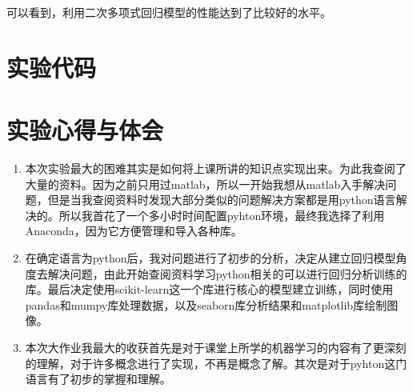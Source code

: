 \documentclass{source/Experiment}
\begin{document}
            可以看到，利用二次多项式回归模型的性能达到了比较好的水平。
    \section{实验代码}
        
    \section{实验心得与体会}
        \begin{enumerate}
            \item 本次实验最大的困难其实是如何将上课所讲的知识点实现出来。为此我查阅了大量的资料。因为之前只用过matlab，所以一开始我想从matlab入手解决问题，但是当我查阅资料时发现大部分类似的问题解决方案都是用python语言解决的。所以我首花了一个多小时时间配置pyhton环境，最终我选择了利用Anaconda，因为它方便管理和导入各种库。
            \item 在确定语言为python后，我对问题进行了初步的分析，决定从建立回归模型角度去解决问题，由此开始查阅资料学习python相关的可以进行回归分析训练的库。最后决定使用scikit-learn这一个库进行核心的模型建立训练，同时使用pandas和mumpy库处理数据，以及seaborn库分析结果和matplotlib库绘制图像。
            \item 本次大作业我最大的收获首先是对于课堂上所学的机器学习的内容有了更深刻的理解，对于许多概念进行了实现，不再是概念了解。其次是对于pyhton这门语言有了初步的掌握和理解。
        \end{enumerate}
\end{document}
